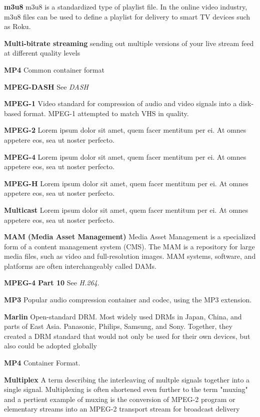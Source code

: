 \smallskip
\textbf{m3u8}
m3u8 is a standardized type of playlist file. In the online video industry, m3u8 files can be used to define a playlist for delivery to smart TV devices such as Roku.

\smallskip
\textbf{Multi-bitrate streaming}
sending out multiple versions of your live stream feed at different quality levels

\smallskip
\textbf{MP4}
Common container format

\smallskip
\textbf{MPEG-DASH}
See \textit{DASH}

\smallskip
\textbf{MPEG-1}
Video standard for compression of audio and video signals into a disk-based format. MPEG-1 attempted to match VHS in quality.

\smallskip
\textbf{MPEG-2}
Lorem ipsum dolor sit amet, quem facer mentitum per ei. At omnes appetere eos, sea ut noster perfecto.

\smallskip
\textbf{MPEG-4}
Lorem ipsum dolor sit amet, quem facer mentitum per ei. At omnes appetere eos, sea ut noster perfecto.

\smallskip
\textbf{MPEG-H}
Lorem ipsum dolor sit amet, quem facer mentitum per ei. At omnes appetere eos, sea ut noster perfecto.

\smallskip
\textbf{Multicast}
Lorem ipsum dolor sit amet, quem facer mentitum per ei. At omnes appetere eos, sea ut noster perfecto.

\smallskip
\textbf{MAM (Media Asset Management)}
Media Asset Management is a specialized form of a content management system (CMS). The MAM is a repository for large media files, such as video and full-resolution images. MAM systems, software, and platforms are often interchangeably called DAMs.

\smallskip
\textbf{MPEG-4 Part 10}
See \textit{H.264}.

\smallskip
\textbf{MP3}
Popular audio compression container and codec, using the MP3 extension.

\smallskip
\textbf{Marlin}
Open-standard DRM. Most widely used DRMs in Japan, China, and parts of East Asia. Panasonic, Philips, Samsung, and Sony. Together, they created a DRM standard that would not only be used for their own devices, but also could be adopted globally


\smallskip
\textbf{MP4}
Container Format.

\smallskip
\textbf{Multiplex}
A term describing the interleaving of multple signals together into a single signal. Multiplexing is often shortened even further to the term "muxing" and a pertient example of muxing is the conversion of MPEG-2 program or elementary streams into an MPEG-2 transport stream for broadcast delivery

